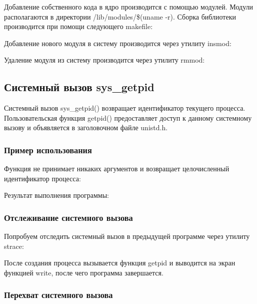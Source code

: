 \documentclass[14pt,a4paper,report]{report}
\begin{document}
Добавление собственного кода в ядро производится с помощью модулей. Модули располагаются в директории /lib/modules/\$(uname -r). Сборка библиотеки производится при помощи следующего makefile:



Добавление нового модуля в систему производится через утилиту insmod:



Удаление модуля из систему производится через утилиту rmmod:



\subsection{Системный вызов sys\_getpid}

Системный вызов sys\_getpid() возвращает идентификатор текущего процесса. Пользовательская функция getpid() предоставляет доступ к данному системному вызову и объявляется в заголовочном файле unistd.h.

\subsubsection{Пример использования}

Функция не принимает никаких аргументов и возвращает целочисленный идентификатор процесса:



Результат выполнения программы:



\subsubsection{Отслеживание системного вызова}

Попробуем отследить системный вызов в предыдущей программе через утилиту strace:



После создания процесса вызывается функция getpid и выводится на экран функцией write, после чего программа завершается.

\subsubsection{Перехват системного вызова}
\end{document}

